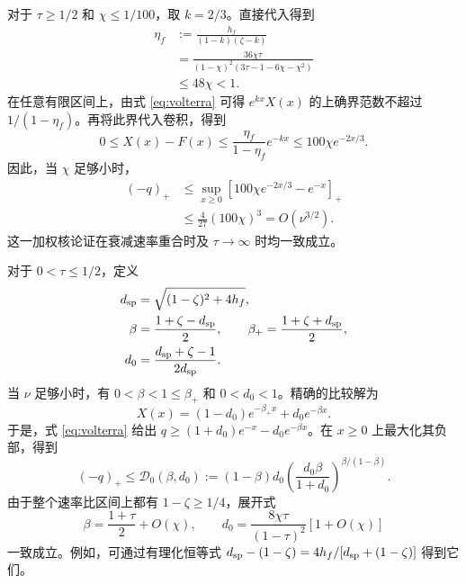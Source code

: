 \documentclass[aps,pra,reprint,amsmath,amssymb,nofootinbib,floatfix,longbibliography]{revtex4-2}
\theoremstyle{aps}
\begin{document}
对于 $\tau\ge1/2$ 和 $\chi\le1/100$，取 $k=2/3$。直接代入得到
\begin{equation}\label{eq:weighted-feedback}
 \begin{aligned}
 \eta_f&:=\frac{h_f}{(1-k)(\zeta-k)}
 \\&=\frac{36\chi\tau}
 {(1-\chi)^2(3\tau-1-6\chi-\chi^2)}
 \\&\le48\chi<1.
 \end{aligned}
\end{equation}
在任意有限区间上，由式 \eqref{eq:volterra} 可得 $e^{kx}X(x)$ 的上确界范数不超过 $1/(1-\eta_f)$。再将此界代入卷积，得到
\begin{equation}\label{eq:diag-large-correction}
 0\le X(x)-F(x)\le\frac{\eta_f}{1-\eta_f}e^{-kx}
 \le100\chi e^{-2x/3}.
\end{equation}
因此，当 $\chi$ 足够小时，
\begin{equation}\label{eq:diag-large}
 \begin{aligned}
 (-q)_+&\le\sup_{x\ge0}[100\chi e^{-2x/3}-e^{-x}]_+
 \\&\le\frac4{27}(100\chi)^3=O(\nu^{3/2}).
 \end{aligned}
\end{equation}
这一加权核论证在衰减速率重合时及 $\tau\to\infty$ 时均一致成立。

对于 $0<\tau\le1/2$，定义
\begin{equation}\label{eq:diag-positive-spectrum}
 \begin{split}
 d_{\rm sp}&=\sqrt{(1-\zeta)^2+4h_f},\\
 \beta&=\frac{1+\zeta-d_{\rm sp}}{2},\qquad
 \beta_+=\frac{1+\zeta+d_{\rm sp}}{2},\\
 d_0&=\frac{d_{\rm sp}+\zeta-1}{2d_{\rm sp}}.
 \end{split}
\end{equation}
当 $\nu$ 足够小时，有 $0<\beta<1\le\beta_+$ 和 $0<d_0<1$。精确的比较解为
\[
 X(x)=(1-d_0)e^{-\beta_+x}+d_0e^{-\beta x}.
\]
于是，式 \eqref{eq:volterra} 给出
$q\ge(1+d_0)e^{-x}-d_0e^{-\beta x}$。在 $x\ge0$ 上最大化其负部，得到
\begin{equation}\label{eq:diag-D}
 (-q)_+\le\mathcal D_0(\beta,d_0)
 :=(1-\beta)d_0
 \left(\frac{d_0\beta}{1+d_0}\right)^{\beta/(1-\beta)}.
\end{equation}
由于整个速率比区间上都有 $1-\zeta\ge1/4$，展开式
\begin{equation}\label{eq:diag-expand}
 \beta=\frac{1+\tau}{2}+O(\chi),\qquad
 d_0=\frac{8\chi\tau}{(1-\tau)^2}[1+O(\chi)]
\end{equation}
一致成立。例如，可通过有理化恒等式
$d_{\rm sp}-(1-\zeta)=4h_f/[d_{\rm sp}+(1-\zeta)]$ 得到它们。
\end{document}
